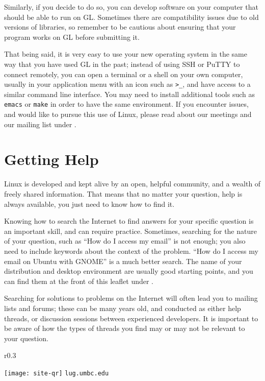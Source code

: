 \documentclass[11pt,notumble]{leaflet}
\begin{document}
Similarly, if you decide to do so, you can develop software on your computer
that should be able to run on GL\@. Sometimes there are compatibility issues due
to old versions of libraries, so remember to be cautious about ensuring that
your program works on GL before submitting it.

That being said, it is very easy to use your new operating system in the same
way that you have used GL in the past; instead of using SSH or PuTTY to connect
remotely, you can open a terminal or a shell on your own computer, usually in
your application menu with an icon such as \verb+>_+, and have access to a
similar command line interface. You may need to install additional tools such as
\texttt{emacs} or \texttt{make} in order to have the same environment. If you
encounter issues, and would like to pursue this use of Linux, please read about
our meetings and our mailing list under .

\section{Getting Help}
\label{section:getting-help}

Linux is developed and kept alive by an open, helpful community, and a wealth of
freely shared information. That means that no matter your question, help is
always available, you just need to know how to find it.

Knowing how to search the Internet to find answers for your specific question is
an important skill, and can require practice. Sometimes, searching for the
nature of your question, such as ``How do I access my email'' is not enough; you
also need to include keywords about the context of the problem. ``How do I
access my email on Ubuntu with GNOME'' is a much better search. The name of your
distribution and desktop environment are usually good starting points, and you
can find them at the front of this leaflet under .

Searching for solutions to problems on the Internet will often lead you to
mailing lists and forums; these can be many years old, and conducted as either
help threads, or discussion sessions between experienced developers. It is
important to be aware of how the types of threads you find may or may not be
relevant to your question.

\begin{wrapfigure}{r}{0.3\textwidth}
    \vspace{-3em}
    \begin{center}
        \texttt{[image: site-qr]}
        \vspace{-2em}
        \texttt{lug.umbc.edu}
    \end{center}
\end{wrapfigure}
\end{document}
